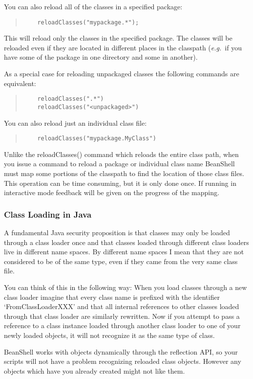 \documentclass[twoside,11pt]{article}
\renewcommand{\_}{\texttt{\symbol{95}}}
\newcommand{\eg}{\textit{e.g.}}
\begin{document}
You can also reload all of the classes in a specified package:
\begin{quote}
\begin{verbatim}
    reloadClasses("mypackage.*");
\end{verbatim}
\end{quote}

This will reload only the classes in the specified package.  The
classes will be reloaded even if they are located in different places
in the classpath (\eg\  if you have some of the package in one
directory and some in another).

As a special case for reloading unpackaged classes the following
commands are equivalent:
\begin{quote}
\begin{verbatim}
    reloadClasses(".*")
    reloadClasses("<unpackaged>")
\end{verbatim}
\end{quote}

You can also reload just an individual class file:
\begin{quote}
\begin{verbatim}
    reloadClasses("mypackage.MyClass")
\end{verbatim}
\end{quote}

Unlike the reloadClasses() command which reloads the entire class path,
when you issue a command to reload a package or individual class name
BeanShell must map some portions of the classpath to find the location
of those class files.  This operation can be time consuming, but it is
only done once.  If running in interactive mode feedback will be given
on the progress of the mapping.

\subsubsection{Class Loading in Java}

A fundamental Java security proposition is that classes may only be
loaded through a class loader once and that classes loaded through
different class loaders live in different name spaces.  By different
name spaces I mean that they are not considered to be of the same
type, even if they came from the very same class file.  

You can think of this in the following way: When you load classes
through a new class loader imagine that every class name is prefixed
with the identifier `FromClassLoaderXXX' and that all internal
references to other classes loaded through that class loader are
similarly rewritten.  Now if you attempt to pass a reference to a
class instance loaded through another class loader to one of your
newly loaded objects, it will not recognize it as the same type of
class.

BeanShell works with objects dynamically through the reflection API,
so your scripts will not have a problem recognizing reloaded class
objects.  However any objects which have you already created might not
like them.
\end{document}
